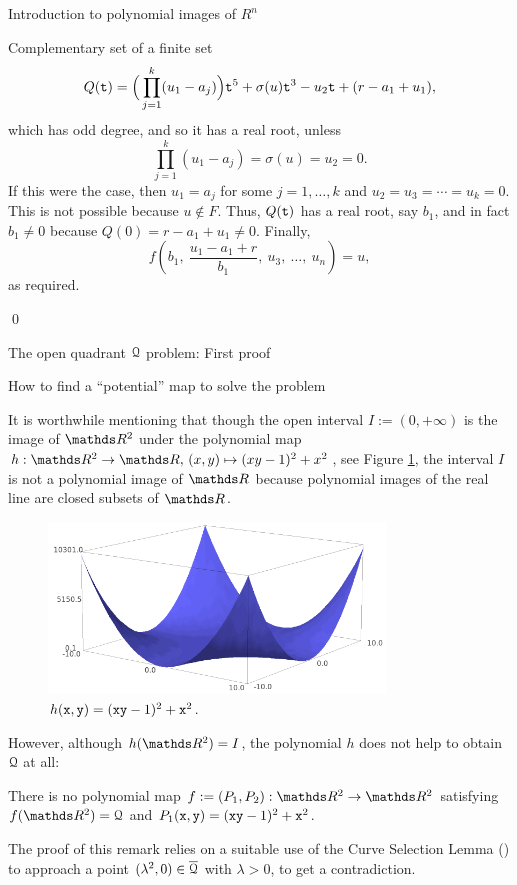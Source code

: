 \documentclass[11pt, a4paper, english, twoside, notitlepage, openright]{report}
\begin{document}
\begin{chapter}{Introduction to polynomial images of $R^n$}
\begin{section}{Complementary set of a finite set}
$$
Q({\tt t})=\Big(\prod_{j=1}^k(u_1-a_j)\Big){\tt t}^{5}+\sigma(u){\tt t}^{3}-u_2{\tt t}+(r-a_1+u_1),
$$
which has odd degree, and so it has a real root, unless 
$$
\prod_{j=1}^k(u_1-a_j)=\sigma(u)=u_2=0.
$$ 
If this were the case, then $u_1=a_j$ for some $j= 1,\dots,k$ and $u_2=u_3=\cdots=u_k=0$. This is not possible because $u\not\in F$. Thus, $Q({\tt t})$ has a real root, say $b_1$, and in fact $b_1\neq0$ because $Q(0)=r-a_1+u_1\neq 0$.
Finally, 
$$
f\left(b_1,\ \frac{u_1-a_1+r}{b_1},\ u_3,\ \dots,\ u_n\right)=u,
$$
as required.

\qed
\end{section}
\end{chapter}

\begin{chapter}{The open quadrant $\mathcal{Q}$ problem: First proof}
\begin{section}{How to find a ``potential'' map to solve the problem}\label{quadReasons}
		
It is worthwhile mentioning that though the open interval $I:=(0,+\infty)$ is the image of $\R^2$ under the polynomial map $h:\R^2\to\R,\, (x,y)\mapsto (xy-1)^2+x^2$, see Figure \ref{fig:h(x,y)}, the interval $I$ is not a polynomial image of $\R$ because polynomial images of the real line are closed subsets of $\R$.
\begin{figure}[h]
\begin{center}
\includegraphics[width=0.8\textwidth]{plots/ch1_03_f(x,y).png}
\caption{$h({\tt x},{\tt y})=({\tt x}{\tt y}-1)^2+{\tt x}^2$.\label{fig:h(x,y)}}
\end{center}
\end{figure}
		
However, although $h(\R^2)=I$, the polynomial $h$ does not help to obtain $\mathcal{Q}$ at all:
\begin{remark}
There is no polynomial map $f:=(P_1, P_2):\R^2\to\R^2$ satisfying $f(\R^2)=\Qu$ and $P_1({\tt x},{\tt y})=({\tt x}{\tt y}-1)^2+{\tt x}^2$.
\end{remark}
The proof of this remark relies on a suitable use of the Curve Selection Lemma (\cite[VIII.2.6]{abr}) to approach a point $(\lambda^2,0)\in\overline{\mathcal{Q}}$ with $\lambda>0$, to get a contradiction.
		

\end{section}
\end{chapter}
\end{document}
